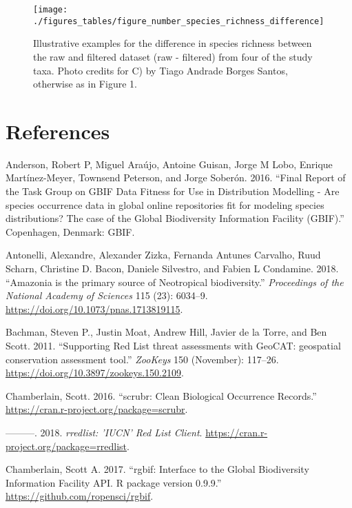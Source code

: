 \documentclass[fleqn,10pt,lineno]{wlpeerj} %
\begin{document}
\begin{figure}
\texttt{[image: ./figures\_tables/figure\_number\_species\_richness\_difference]} \caption{Illustrative examples for the difference in species richness between the raw and filtered dataset (raw - filtered) from four of the study taxa. Photo credits for C) by Tiago Andrade Borges Santos, otherwise as in Figure 1.}\label{fig:speciesrichness}
\end{figure}

\newpage{}

\hypertarget{references}{%
\section*{References}\label{references}}

\hypertarget{refs}{}
\leavevmode\hypertarget{ref-Anderson2016}{}%
Anderson, Robert P, Miguel Araújo, Antoine Guisan, Jorge M Lobo, Enrique Martínez-Meyer, Townsend Peterson, and Jorge Soberón. 2016. ``Final Report of the Task Group on GBIF Data Fitness for Use in Distribution Modelling - Are species occurrence data in global online repositories fit for modeling species distributions? The case of the Global Biodiversity Information Facility (GBIF).'' Copenhagen, Denmark: GBIF.

\leavevmode\hypertarget{ref-Antonelli2018}{}%
Antonelli, Alexandre, Alexander Zizka, Fernanda Antunes Carvalho, Ruud Scharn, Christine D. Bacon, Daniele Silvestro, and Fabien L Condamine. 2018. ``Amazonia is the primary source of Neotropical biodiversity.'' \emph{Proceedings of the National Academy of Sciences} 115 (23): 6034--9. \url{https://doi.org/10.1073/pnas.1713819115}.

\leavevmode\hypertarget{ref-Bachman2011}{}%
Bachman, Steven P., Justin Moat, Andrew Hill, Javier de la Torre, and Ben Scott. 2011. ``Supporting Red List threat assessments with GeoCAT: geospatial conservation assessment tool.'' \emph{ZooKeys} 150 (November): 117--26. \url{https://doi.org/10.3897/zookeys.150.2109}.

\leavevmode\hypertarget{ref-Chamberlain2016}{}%
Chamberlain, Scott. 2016. ``scrubr: Clean Biological Occurrence Records.'' \url{https://cran.r-project.org/package=scrubr}.

\leavevmode\hypertarget{ref-Chamberlain2018}{}%
---------. 2018. \emph{rredlist: 'IUCN' Red List Client}. \url{https://cran.r-project.org/package=rredlist}.

\leavevmode\hypertarget{ref-Chamberlain2017}{}%
Chamberlain, Scott A. 2017. ``rgbif: Interface to the Global Biodiversity Information Facility API. R package version 0.9.9.'' \url{https://github.com/ropensci/rgbif}.
\end{document}
